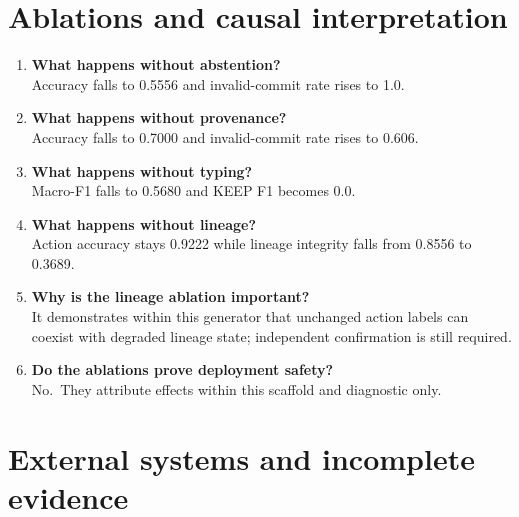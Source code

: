 \section{Ablations and causal
interpretation}\label{ablations-and-causal-interpretation}

\begin{enumerate}
\def\labelenumi{\arabic{enumi}.}
\setcounter{enumi}{30}
\item
  \textbf{What happens without abstention?}\\
  Accuracy falls to 0.5556 and invalid-commit rate rises to 1.0.
\item
  \textbf{What happens without provenance?}\\
  Accuracy falls to 0.7000 and invalid-commit rate rises to 0.606.
\item
  \textbf{What happens without typing?}\\
  Macro-F1 falls to 0.5680 and KEEP F1 becomes 0.0.
\item
  \textbf{What happens without lineage?}\\
  Action accuracy stays 0.9222 while lineage integrity falls from 0.8556
  to 0.3689.
\item
  \textbf{Why is the lineage ablation important?}\\
  It demonstrates within this generator that unchanged action labels can
  coexist with degraded lineage state; independent confirmation is still
  required.
\item
  \textbf{Do the ablations prove deployment safety?}\\
  No.~They attribute effects within this scaffold and diagnostic only.
\end{enumerate}

\section{External systems and incomplete
evidence}\label{external-systems-and-incomplete-evidence}

